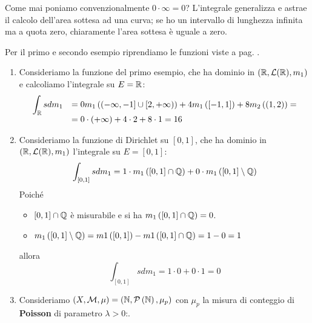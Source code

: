 \begin{observe}
	Come mai poniamo convenzionalmente $0\cdot \infty=0$? L'integrale generalizza e astrae il calcolo dell'area sottesa ad una curva; se ho un intervallo di lunghezza infinita ma a quota zero, chiaramente l'area sottesa è uguale a zero.
\end{observe}
\begin{examples} Per il primo e secondo esempio riprendiamo le funzioni viste a pag. \pageref{funzionesemplice}.
	\begin{enumerate}
		\item Consideriamo la funzione del primo esempio, che ha dominio in $\left(\mathbb{R},\mathcal{L}(\mathbb{R}),m_1\right)$ e calcoliamo l'integrale su $E=\mathbb{R}$:
		\begin{equation*}
			\begin{array}{ll}
				\displaystyle	\int_{\mathbb{R}}sdm_1&=0m_1\left(\left(-\infty,-1\right]\cup\left[2,+\infty\right)\right)+4m_1\left(\left[-1,1\right]\right)+8m_2\left(\left(1,2\right)\right)=\\
				&=0\cdot\left(+\infty\right)+4\cdot 2+8\cdot 1=16
			\end{array}
		\end{equation*}
		\item \label{funzionedirichletintegrale}Consideriamo la funzione di Dirichlet su $\left[0,1\right]$, che ha dominio in $\left(\mathbb{R},\mathcal{L}(\mathbb{R}),m_1\right)$  l'integrale su $E=\left[0,1\right]$:
		\begin{equation*}
			\int_{\left[0,1\right]}sdm_1=1\cdot m_1\left(\left[0,1\right]\cap\mathbb{Q}\right)+0\cdot m_1\left(\left[0,1\right]\setminus\mathbb{Q}\right)
		\end{equation*}
	Poiché
	\begin{itemize}
		\item $\left[0,1\right]\cap \mathbb{Q}$ è misurabile e si ha $m_1\left(\left[0,1\right]\cap \mathbb{Q}\right)=0$.
		\item $m_1\left(\left[0,1\right]\setminus\mathbb{Q}\right)=m1\left(\left[0,1\right]\right)-m1\left(\left[0,1\right]\cap\mathbb{Q}\right)=1-0=1$
	\end{itemize}
	allora
	\begin{equation*}
		\int_{\left[0,1\right]}sdm_1=1\cdot 0+0\cdot 1=0
	\end{equation*}
\item Consideriamo $\left(X,\mathcal{M},\mu\right)=\left(\mathbb{N},\mathcal{P}\left(\mathbb{N}\right),\mu_p\right)$ con $\mu_p$ la misura di conteggio di \textbf{Poisson} di parametro $\lambda>0$:.

\end{enumerate}
\end{examples}
